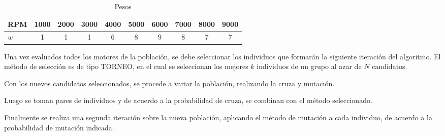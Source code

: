 \begin{table}
  \centering
  \begin{tabular}{lccccccccc} \toprule
      RPM & 1000 & 2000 & 3000 & 4000 & 5000 & 6000 & 7000 & 8000 & 9000 \\ \midrule
      $w$ & 1 & 1 & 1 & 6 & 8 & 9 & 8 & 7 & 7 \\ \bottomrule 
  \end{tabular}
  \caption{Pesos}\label{tab:pesos}
\end{table}


Una vez evaluados todos los motores de la población, se debe seleccionar los
individuos que formarán la siguiente iteración del algoritmo.
%
El método de selección es de tipo TORNEO, en el cual se seleccionan los mejores
$k$ individuos de un grupo al azar de $N$ candidatos.
%

Con los nuevos candidatos seleccionados, se procede a variar la población,
realizando la cruza y mutación.

Luego se toman pares de individuos y de acuerdo a la probabilidad de cruza, se
combinan con el método seleccionado.

Finalmente se realiza una segunda iteración sobre la nueva población, aplicando
el método de mutación a cada individuo, de acuerdo a la probabilidad de
mutación indicada.




